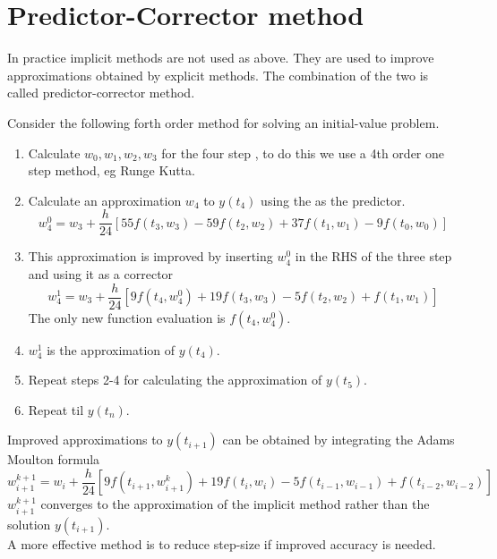 \section{Predictor-Corrector method}
In practice implicit methods are not used as above.  They are used to improve 
approximations obtained by explicit methods. The combination of the two is
called predictor-corrector method.
\begin{example}
Consider the following forth order method for solving an initial-value problem.
\begin{enumerate}
\item
Calculate $w_0,w_1,w_2,w_3$ for the four step , to do this
we use a 4th order one step method, eg Runge Kutta.
\item
Calculate an approximation $w_4$ to $y(t_4)$ using the  as
the predictor.
\[w^0_4=w_3+\frac{h}{24}[55f(t_3,w_3)-59f(t_{2},w_{2})+37f(t_1,w_1)-9f(t_0,w_0)] \]
\item
This approximation is improved by inserting $w^0_4$ in the RHS of the three step
 and using it as a corrector
\[w^1_4=w_3+\frac{h}{24}[9f(t_4,w_4^0)+19f(t_{3},w_{3})-5f(t_2,w_2)+f(t_1,w_1)] \]
The only new function evaluation is $f(t_4,w_4^0)$.
\item
$w_4^1$ is the approximation of $y(t_4)$.
\item
Repeat steps 2-4 for calculating the approximation of $y(t_5)$.
\item
Repeat til $y(t_n)$.
\end{enumerate}
\end{example}
Improved approximations to $y(t_{i+1})$ can be obtained by integrating the Adams
Moulton formula
\[w^{k+1}_{i+1}=w_i+\frac{h}{24}[9f(t_{i+1},w_{i+1}^k)+19f(t_{i},w_{i})-5f(t_{i-1},w_{i-1})+f(t_{i-2},w_{i-2})] \]
$w^{k+1}_{i+1}$ converges to the approximation of the implicit method rather than
the solution $y(t_{i+1})$.\\
A more effective method is to reduce step-size if improved accuracy is needed.
